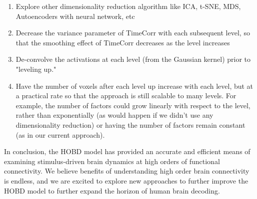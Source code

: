 \documentclass[11pt]{article}
\begin{document}
\begin{enumerate}
\item Explore other dimensionality reduction algorithm like ICA, t-SNE, MDS, Autoencoders with neural network, etc
\item Decrease the variance parameter of TimeCorr with each subsequent level, so that the smoothing effect of TimeCorr decreases as the level increases
\item De-convolve the activations at each level (from the Gaussian kernel) prior to "leveling up."
\item Have the number of voxels after each level up increase with each level, but at a practical rate so that the approach is still scalable to many levels. For example, the number of factors could grow linearly with respect to the level, rather than exponentially (as would happen if we didn't use any dimensionality reduction) or having the number of factors remain constant (as in our current approach).
\end{enumerate}

In conclusion, the HOBD model has provided an accurate and efficient means of examining stimulus-driven brain dynamics at high orders of functional connectivity. We believe benefits of understanding high order brain connectivity is endless, and we are excited to explore new approaches to further improve the HOBD model to further expand the horizon of human brain decoding.
\end{document}
